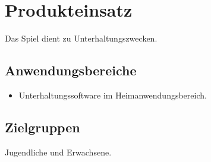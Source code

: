 \chapter{Produkteinsatz}

Das Spiel dient zu Unterhaltungszwecken.

\section{Anwendungsbereiche}


\begin{itemize}

	\item Unterhaltungssoftware im Heimanwendungsbereich. 
	
\end{itemize}

\section{Zielgruppen}

Jugendliche und Erwachsene.




